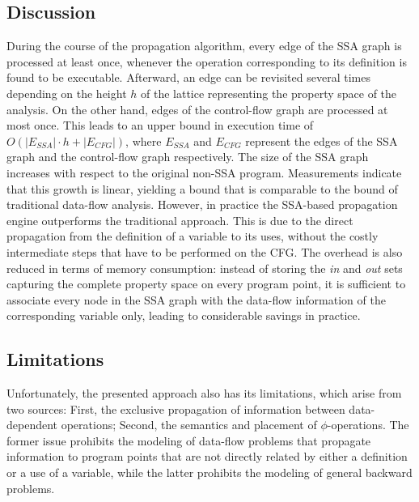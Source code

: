 \subsection{Discussion}

{
\def\ESSA{E_{\textit{SSA}}}
\def\ECFG{E_{\textit{CFG}}}
During the course of the propagation algorithm, every edge of the SSA graph is
processed at least once, whenever the operation corresponding to its definition
is found to be executable. Afterward, an edge can be revisited several times
depending on the height $h$ of the lattice representing the property
space of the analysis. On the other hand, edges of the control-flow graph are processed at most
once. This leads to an upper bound in execution time of $O(|\ESSA| \cdot h +
|\ECFG|)$, where $\ESSA$ and $\ECFG$ represent the edges of the SSA graph
and the control-flow graph respectively. The size of the
SSA graph increases with respect to the original non-SSA program. Measurements
indicate that this growth is linear, yielding a
bound that is comparable to the bound of traditional data-flow analysis.
However, in practice the SSA-based propagation engine outperforms the
traditional approach. This is  due to the direct propagation from the definition
of a variable to its uses, without the costly intermediate steps that have to be
performed on the CFG. The overhead is also reduced in terms of memory
consumption: instead of storing the \emph{in} and \emph{out} sets capturing the
complete property space on every program point, it is sufficient to
associate every node in the SSA graph with the data-flow information of the
corresponding variable only, leading to considerable savings in practice.
}

\subsection{Limitations}

Unfortunately, the presented approach also has its limitations, which arise from
two sources: First, the exclusive
propagation of information between data-dependent operations; 
Second, the
semantics and placement of $\phi$-operations. The former issue prohibits the
modeling of data-flow problems that propagate information to program points that
are not directly related by either a definition or a use of a variable, while
the latter prohibits the modeling of general backward problems.

